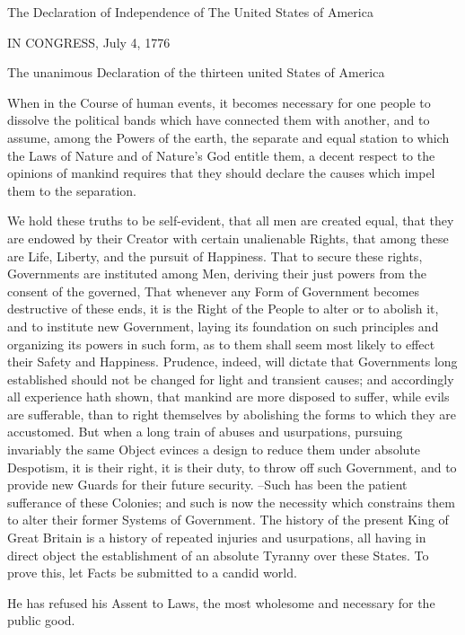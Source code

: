 \documentclass{article}
\begin{document}
The Declaration of Independence of The United States of America




IN CONGRESS, July 4, 1776

The unanimous Declaration of the thirteen united States of America



When in the Course of human events, it becomes necessary for
one people to dissolve the political bands which have connected
them with another, and to assume, among the Powers of the earth,
the separate and equal station to which the Laws of Nature and
of Nature's God entitle them, a decent respect to the opinions
of mankind requires that they should declare the causes which
impel them to the separation.

We hold these truths to be self-evident, that all men are created equal,
that they are endowed by their Creator with certain unalienable Rights,
that among these are Life, Liberty, and the pursuit of Happiness.
That to secure these rights, Governments are instituted among Men,
deriving their just powers from the consent of the governed,
That whenever any Form of Government becomes destructive of these ends,
it is the Right of the People to alter or to abolish it, and to institute
new Government, laying its foundation on such principles and organizing
its powers in such form, as to them shall seem most likely to effect
their Safety and Happiness.  Prudence, indeed, will dictate that Governments
long established should not be changed for light and transient causes;
and accordingly all experience hath shown, that mankind are more disposed
to suffer, while evils are sufferable, than to right themselves by abolishing
the forms to which they are accustomed.  But when a long train of abuses and
usurpations, pursuing invariably the same Object evinces a design to reduce
them under absolute Despotism, it is their right, it is their duty, to throw
off such Government, and to provide new Guards for their future security.
--Such has been the patient sufferance of these Colonies; and such is now
the necessity which constrains them to alter their former Systems of Government.
The history of the present King of Great Britain is a history of repeated
injuries and usurpations, all having in direct object the establishment
of an absolute Tyranny over these States.  To prove this, let Facts
be submitted to a candid world.

He has refused his Assent to Laws, the most wholesome and necessary
for the public good.
\end{document}
